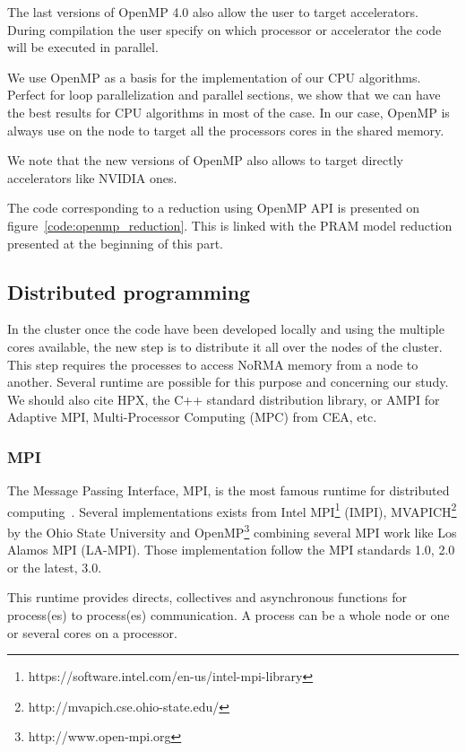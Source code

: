 The last versions of OpenMP 4.0 also allow the user to target accelerators. 
During compilation the user specify on which processor or accelerator the code will be executed in parallel. 

We use OpenMP as a basis for the implementation of our CPU algorithms. 
Perfect for loop parallelization and parallel sections, we show that we can have the best results for CPU algorithms in most of the case. 
In our case, OpenMP is always use on the node to target all the processors cores in the shared memory. 

We note that the new versions of OpenMP also allows to target directly accelerators like NVIDIA ones. 

The code corresponding to a reduction using OpenMP API is presented on figure~\ref{code:openmp_reduction}.
This is linked with the PRAM model reduction presented at the beginning of this part. 

\subsection{Distributed programming}
In the cluster once the code have been developed locally and using the multiple cores available, the new step is to distribute it all over the nodes of the cluster. 
This step requires the processes to access NoRMA memory from a node to another. 
Several runtime are possible for this purpose and concerning our study. 
We should also cite HPX, the C++ standard distribution library, or AMPI for Adaptive MPI, Multi-Processor Computing (MPC) from CEA, etc.

\subsubsection{MPI}
The Message Passing Interface, MPI, is the most famous runtime for distributed computing~\cite{gropp2014using,gropp2015using}.
Several implementations exists from Intel MPI\footnote{https://software.intel.com/en-us/intel-mpi-library} (IMPI), MVAPICH\footnote{http://mvapich.cse.ohio-state.edu/} by the Ohio State University and OpenMP\footnote{http://www.open-mpi.org} combining several MPI work like Los Alamos MPI (LA-MPI).
Those implementation follow the MPI standards 1.0, 2.0 or the latest, 3.0. 

This runtime provides directs, collectives and asynchronous functions for process(es) to process(es) communication.
A process can be a whole node or one or several cores on a processor.  

